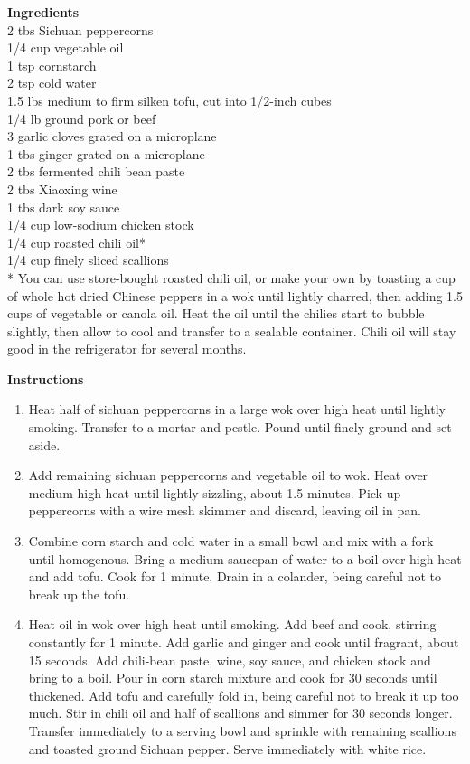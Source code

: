 \documentclass{article}
\numberwithin{figure}{section}
\numberwithin{equation}{section}
\begin{document}
{\bf Ingredients}\\
2 tbs Sichuan peppercorns\\
1/4 cup vegetable oil\\
1 tsp cornstarch\\
2 tsp cold water\\
1.5 lbs medium to firm silken tofu, cut into 1/2-inch cubes\\
1/4 lb ground pork or beef\\
3 garlic cloves grated on a microplane\\
1 tbs ginger grated on a microplane\\
2 tbs fermented chili bean paste\\
2 tbs Xiaoxing wine\\
1 tbs dark soy sauce\\
1/4 cup low-sodium chicken stock\\
1/4 cup roasted chili oil*\\
1/4 cup finely sliced scallions\\

* You can use store-bought roasted chili oil, or make your own by toasting a cup of whole hot dried Chinese peppers in a wok until lightly charred, then adding 1.5 cups of vegetable or canola oil. Heat the oil until the chilies start to bubble slightly, then allow to cool and transfer to a sealable container. Chili oil will stay good in the refrigerator for several months.

{\bf Instructions}
\begin{enumerate}
\item Heat half of sichuan peppercorns in a large wok over high heat until lightly smoking. Transfer to a mortar and pestle. Pound until finely ground and set aside.
\item Add remaining sichuan peppercorns and vegetable oil to wok. Heat over medium high heat until lightly sizzling, about 1.5 minutes. Pick up peppercorns with a wire mesh skimmer and discard, leaving oil in pan.
\item Combine corn starch and cold water in a small bowl and mix with a fork until homogenous. Bring a medium saucepan of water to a boil over high heat and add tofu. Cook for 1 minute. Drain in a colander, being careful not to break up the tofu.
\item Heat oil in wok over high heat until smoking. Add beef and cook, stirring constantly for 1 minute. Add garlic and ginger and cook until fragrant, about 15 seconds. Add chili-bean paste, wine, soy sauce, and chicken stock and bring to a boil. Pour in corn starch mixture and cook for 30 seconds until thickened. Add tofu and carefully fold in, being careful not to break it up too much. Stir in chili oil and half of scallions and simmer for 30 seconds longer. Transfer immediately to a serving bowl and sprinkle with remaining scallions and toasted ground Sichuan pepper. Serve immediately with white rice.
\end{enumerate}
\end{document}
